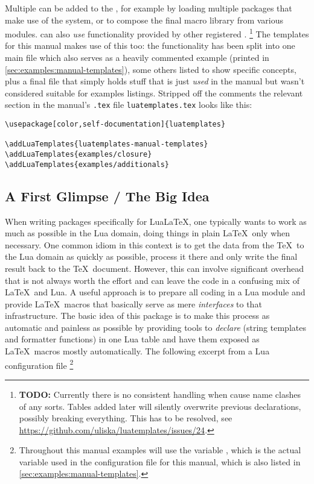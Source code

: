 \documentclass[12pt]{scrartcl}
\begin{document}
Multiple  can be added to the
, for example by loading multiple packages that make use
of the system, or to compose the final macro library from various modules.
 can also \emph{use} functionality
provided by other registered .%
\footnote{\textbf{TODO:} Currently there is no consistent handling when
 cause name clashes of any sorts. Tables
added later will silently overwrite previous declarations, possibly breaking
everything. This has to be resolved, see
\url{https://github.com/uliska/luatemplates/issues/24}.} %
The templates for this manual makes use of this too: the functionality has been
split into one main file which also serves as a heavily commented example
(printed in \vref{sec:examples:manual-templates}), some others listed to show
specific concepts, plus a final file that simply holds stuff that is just
\emph{used} in the manual but wasn't considered suitable for examples listings.
Stripped off the comments the relevant section in the manual's \texttt{.tex}
file \texttt{luatemplates.tex} looks like this:

\begin{verbatim}
\usepackage[color,self-documentation]{luatemplates}

\addLuaTemplates{luatemplates-manual-templates}
\addLuaTemplates{examples/closure}
\addLuaTemplates{examples/additionals}
\end{verbatim}


\subsection{A First Glimpse / The Big Idea}
\label{sec:a-first-glimpse}

When writing packages specifically for Lua\LaTeX, one typically wants to work as
much as possible in the Lua domain, doing things in plain \LaTeX\ only when
necessary.  One common idiom in this context is to get the data from the \TeX\
to the Lua domain as quickly as possible, process it there and only write the
final result back to the \TeX\ document.  However, this can involve significant
overhead that is not always worth the effort and can leave the code in a
confusing mix of \LaTeX\ and Lua.  A useful approach is to prepare all coding in
a Lua module and provide \LaTeX\ macros that basically serve as mere
\emph{interfaces} to that infrastructure.  The basic idea of this package is to
make this process as automatic and painless as possible by providing tools to
\emph{declare} \term{Formatters} (string templates and formatter functions) in
one Lua table and have them exposed as \LaTeX\ macros mostly automatically.  The
following excerpt from a Lua configuration file%
\footnote{Throughout this manual examples will use the variable ,
which is the actual variable used in the configuration file for this manual,
which is also listed in \vref{sec:examples:manual-templates}.}%
\end{document}
